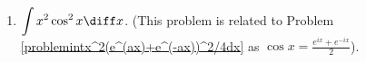 \begin{multicols}{2}
\begin{enumerate}[ref={\fcProblemRef}]
\item $\displaystyle\int x^2\cos^2x \diff x$. (This problem is related to Problem  \ref{problemintx^2(e^(ax)+e^(-ax))^2/4dx} as $\cos x= \frac{ e^{ix} + e^{-ix}}{2}$).

\end{enumerate}
\end{multicols}

